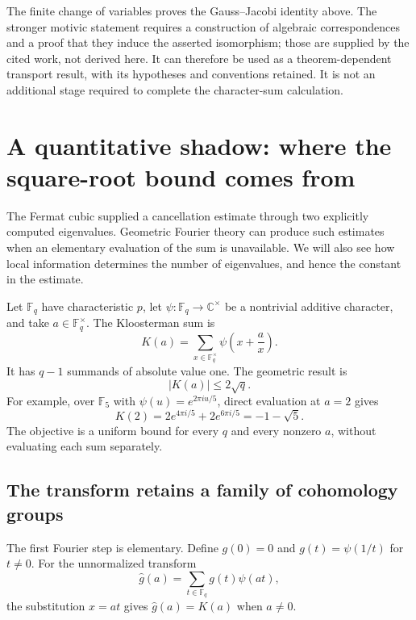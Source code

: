 \documentclass[11pt]{article}
\theoremstyle{remark}
\begin{document}
The finite change of variables proves the Gauss--Jacobi identity above. The stronger motivic statement requires a construction of algebraic correspondences and a proof that they induce the asserted isomorphism; those are supplied by the cited work, not derived here. It can therefore be used as a theorem-dependent transport result, with its hypotheses and conventions retained. It is not an additional stage required to complete the character-sum calculation.

\section{A quantitative shadow: where the square-root bound comes from}
\label{estimate:section}

The Fermat cubic supplied a cancellation estimate through two explicitly computed eigenvalues. Geometric Fourier theory can produce such estimates when an elementary evaluation of the sum is unavailable. We will also see how local information determines the number of eigenvalues, and hence the constant in the estimate.

Let \(\mathbb F_q\) have characteristic \(p\), let \(\psi:\mathbb F_q\to\mathbb C^\times\) be a nontrivial additive character, and take \(a\in\mathbb F_q^\times\). The Kloosterman sum is
\begin{equation}
K(a)=\sum_{x\in\mathbb F_q^\times}
\psi\!\left(x+\frac ax\right).
\label{estimate:kloosterman}
\end{equation}
It has \(q-1\) summands of absolute value one. The geometric result is
\begin{equation}
\boxed{|K(a)|\le2\sqrt q.}
\label{estimate:bound}
\end{equation}
For example, over \(\mathbb F_5\) with \(\psi(u)=e^{2\pi iu/5}\), direct evaluation at \(a=2\) gives
\[
K(2)=2e^{4\pi i/5}+2e^{6\pi i/5}=-1-\sqrt5.
\]
The objective is a uniform bound for every \(q\) and every nonzero \(a\), without evaluating each sum separately.

\subsection{The transform retains a family of cohomology groups}

The first Fourier step is elementary. Define \(g(0)=0\) and \(g(t)=\psi(1/t)\) for \(t\ne0\). For the unnormalized transform
\[
\widehat g(a)=\sum_{t\in\mathbb F_q}g(t)\psi(at),
\]
the substitution \(x=at\) gives \(\widehat g(a)=K(a)\) when \(a\ne0\).
\end{document}
